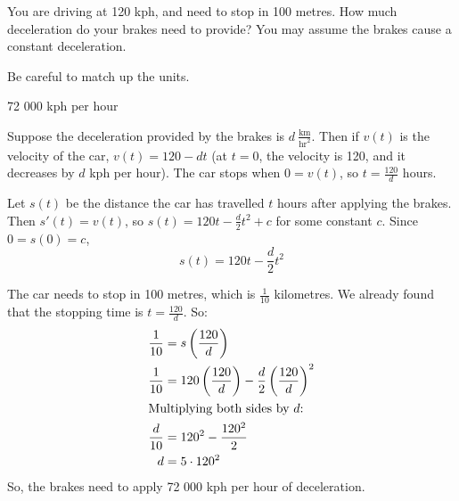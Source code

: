 \begin{Mquestion}
You are driving at 120 kph, and need to stop in 100 metres. How much deceleration do your brakes need to provide? You may assume the brakes cause a constant deceleration.
\end{Mquestion}
\begin{hint}
Be careful to match up the units.
\end{hint}
\begin{answer}
72 000 kph per hour
\end{answer}
\begin{solution}
Suppose the deceleration provided by the brakes is $d~\frac{\mathrm{km}}{\mathrm{hr}^2}$. Then if $v(t)$ is the velocity of the car, $v(t)=120-dt$ (at $t=0$, the velocity is 120, and it decreases by $d$ kph per hour). The car stops when $0=v(t)$, so $t=\frac{120}{d}$ hours.

Let $s(t)$ be the distance the car has travelled $t$ hours after applying the brakes. Then $s'(t)=v(t)$, so $s(t)=120t-\frac{d}{2}t^2+c$ for some constant $c$. Since $0=s(0)=c$,
\[s(t)=120t-\frac{d}{2}t^2\]

The car needs to stop in 100 metres, which is $\frac{1}{10}$ kilometres. We already found that the stopping time is $t=\frac{120}{d}$. So:
\begin{align*}
\frac{1}{10}&=s\left(\frac{120}{d}\right)\\
\frac{1}{10}&=120\left(\frac{120}{d}\right)-\frac{d}{2}\left(\frac{120}{d}\right)^2\\
\intertext{Multiplying both sides by $d$:}
\frac{d}{10}&=120^2-\frac{120^2}{2}\\
d&=5\cdot 120^2
\end{align*}
So, the brakes need to apply 72 000 kph per hour of deceleration.
\end{solution}



